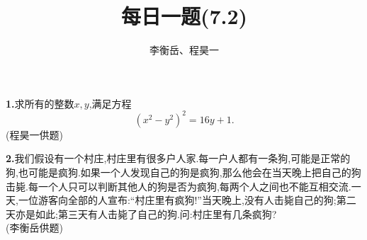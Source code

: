 \documentclass{article}
\title{每日一题(7.2)}
\author{李衡岳、程昊一}
\begin{document}
\maketitle
\textbf{1.}求所有的整数$x,y$,满足方程
\[(x^2-y^2)^2=16y+1.\]
{(程昊一供题)}\\
\par\textbf{2.}我们假设有一个村庄,村庄里有很多户人家.每一户人都有一条狗,可能是正常的狗,也可能是疯狗.如果一个人发现自己的狗是疯狗,那么他会在当天晚上把自己的狗击毙.每一个人只可以判断其他人的狗是否为疯狗,每两个人之间也不能互相交流.一天,一位游客向全部的人宣布:“村庄里有疯狗!”当天晚上,没有人击毙自己的狗;第二天亦是如此;第三天有人击毙了自己的狗.问:村庄里有几条疯狗?\\
{(李衡岳供题)}
\end{document}
